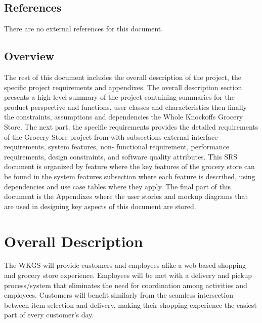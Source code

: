 \documentclass{scrreprt}
\theoremstyle{funreq}
\begin{document}
\section{References}
There are no external references for this document.

\section{Overview}
The rest of this document includes the overall description of the project, the specific project requirements and appendixes. The overall description section presents a high-level summary of the project containing summaries for the product perspective and functions, user classes and characteristics then finally the constraints, assumptions and dependencies the Whole Knockoffs Grocery Store. The next part, the specific requirements provides the detailed requirements of the Grocery Store project from with subsections external interface requirements, system features, non- functional requirement, performance requirements, design constraints, and software quality attributes. This SRS document is organized by feature where the key features of the grocery store can be found in the system features subsection where each feature is described, using dependencies and use case tables where they apply. The final part of this document is the Appendixes where the user stories and mockup diagrams that are used in designing key aspects of this document are stored.

{\let\clearpage\relax 
\chapter{Overall Description}}

The WKGS will provide customers and employees alike a web-based shopping and grocery store experience. Employees will be met with a delivery and pickup process/system that eliminates the need for coordination among activities and employees. Customers will benefit similarly from the seamless intersection between item selection and delivery, making their shopping experience the easiest part of every customer's day. 

\end{document}
